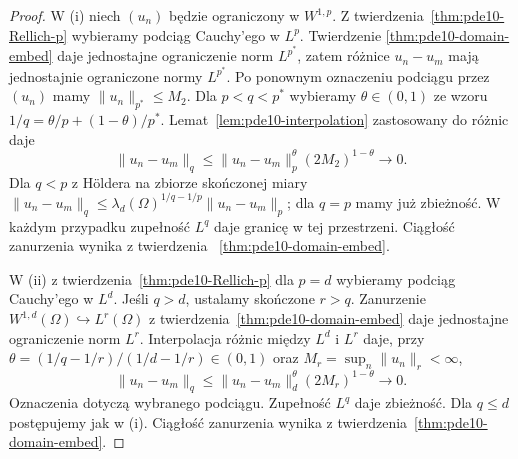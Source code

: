 \begin{proof}
W (i) niech $(u_n)$ będzie ograniczony w $W^{1,p}$.
Z twierdzenia~\ref{thm:pde10-Rellich-p} wybieramy
podciąg Cauchy'ego w $L^p$. Twierdzenie
\ref{thm:pde10-domain-embed} daje jednostajne
ograniczenie norm $L^{p^*}$, zatem różnice
$u_n-u_m$ mają jednostajnie ograniczone normy $L^{p^*}$.
Po ponownym oznaczeniu podciągu przez $(u_n)$
mamy $\|u_n\|_{p^*}\le M_2$.
Dla $p<q<p^*$ wybieramy $\theta\in(0,1)$ ze wzoru
$1/q=\theta/p+(1-\theta)/p^*$.
Lemat~\ref{lem:pde10-interpolation} zastosowany do
różnic daje
\[
 \|u_n-u_m\|_q
 \le\|u_n-u_m\|_p^\theta(2M_2)^{1-\theta}
 \longrightarrow0.
\]
Dla $q<p$ z Höldera na zbiorze skończonej miary
$\|u_n-u_m\|_q\le
\lambda_d(\Omega)^{1/q-1/p}\|u_n-u_m\|_p$;
dla $q=p$ mamy już zbieżność. W każdym przypadku
zupełność $L^q$ daje granicę w tej przestrzeni.
Ciągłość zanurzenia wynika z twierdzenia
~\ref{thm:pde10-domain-embed}.

W (ii) z twierdzenia~\ref{thm:pde10-Rellich-p}
dla $p=d$ wybieramy podciąg Cauchy'ego w $L^d$.
Jeśli $q>d$, ustalamy skończone $r>q$.
Zanurzenie $W^{1,d}(\Omega)\hookrightarrow L^r(\Omega)$
z twierdzenia~\ref{thm:pde10-domain-embed} daje
jednostajne ograniczenie norm $L^r$. Interpolacja
różnic między $L^d$ i $L^r$ daje, przy
$\theta=(1/q-1/r)/(1/d-1/r)\in(0,1)$
oraz $M_r=\sup_n\|u_n\|_r<\infty$,
\[
 \|u_n-u_m\|_q
 \le\|u_n-u_m\|_d^\theta(2M_r)^{1-\theta}
 \longrightarrow0.
\]
Oznaczenia dotyczą wybranego podciągu.
Zupełność $L^q$ daje zbieżność. Dla $q\le d$
postępujemy jak w (i). Ciągłość zanurzenia wynika
z twierdzenia~\ref{thm:pde10-domain-embed}.


\end{proof}
